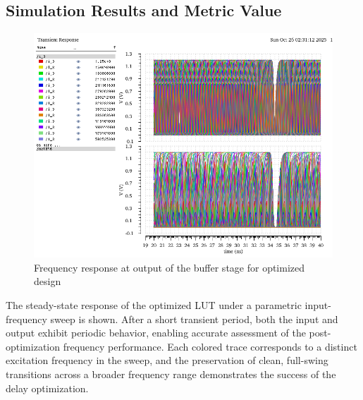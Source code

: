 \documentclass[12pt]{article}
\begin{document}
\newpage

\subsection{Simulation Results and Metric Value}

\begin{figure}[H]
    \centering
    \includegraphics[width=\linewidth]{writeup//figures/frequency_response_param_20_40_optimized.png}
    \caption{Frequency response at output of the buffer stage for optimized design}
\end{figure}
The steady-state response of the optimized LUT under a parametric input-frequency sweep is shown. After a short transient period, both the input and output exhibit periodic behavior, enabling accurate assessment of the post-optimization frequency performance. Each colored trace corresponds to a distinct excitation frequency in the sweep, and the preservation of clean, full-swing transitions across a broader frequency range demonstrates the success of the delay optimization.
\end{document}
